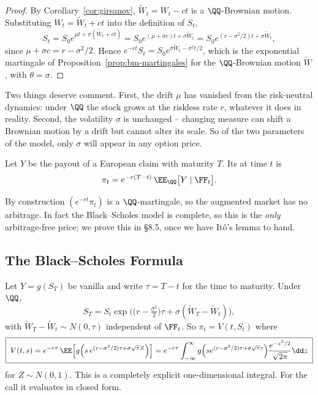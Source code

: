 \begin{proof}
	By Corollary~\ref{cor:girsanov}, $\tilde W_t = W_t - ct$ is a $\QQ$-Brownian motion. Substituting $W_t = \tilde W_t + ct$ into the definition of $S_t$,
	$$
	S_t = S_0 e^{\mu t + \sigma(\tilde W_t + ct)} = S_0 e^{(\mu + \sigma c)t + \sigma\tilde W_t} = S_0e^{(r-\sigma^2/2)t + \sigma\tilde W_t},
	$$
	since $\mu + \sigma c = r - \sigma^2/2$. Hence $e^{-rt}S_t = S_0e^{\sigma\tilde W_t - \sigma^2t/2}$, which is the exponential martingale of Proposition~\ref{prop:bm-martingales} for the $\QQ$-Brownian motion $\tilde W$, with $\theta = \sigma$.
\end{proof}

Two things deserve comment. First, the drift $\mu$ has vanished from the risk-neutral dynamics: under $\QQ$ the stock grows at the riskless rate $r$, whatever it does in reality. Second, the volatility $\sigma$ is unchanged -- changing measure can shift a Brownian motion by a drift but cannot alter its scale. So of the two parameters of the model, only $\sigma$ will appear in any option price.

\begin{definition}
	Let $Y$ be the payout of a European claim with maturity $T$. Its  at time $t$ is
	$$
	\pi_t = e^{-r(T-t)}\,\EE_\QQ\big[Y \mid \FF_t\big].
	$$
\end{definition}

By construction $(e^{-rt}\pi_t)$ is a $\QQ$-martingale, so the augmented market has no arbitrage. In fact the Black--Scholes model is complete, so this is the \emph{only} arbitrage-free price; we prove this in \S8.5, once we have It\^o's lemma to hand.

\subsection{The Black--Scholes Formula}

Let $Y = g(S_T)$ be vanilla and write $\tau = T-t$ for the time to maturity. Under $\QQ$,
$$
S_T = S_t\exp\Big(\big(r-\tfrac{\sigma^2}{2}\big)\tau + \sigma(\tilde W_T - \tilde W_t)\Big),
$$
with $\tilde W_T - \tilde W_t \sim N(0,\tau)$ independent of $\FF_t$. So $\pi_t = V(t,S_t)$ where
$$
\boxed{\;V(t,s) = e^{-r\tau}\,\EE\Big[g\Big(s\,e^{(r-\sigma^2/2)\tau + \sigma\sqrt\tau Z}\Big)\Big] = e^{-r\tau}\int_{-\infty}^\infty g\Big(se^{(r-\sigma^2/2)\tau+\sigma\sqrt\tau z}\Big)\frac{e^{-z^2/2}}{\sqrt{2\pi}}\dd z\;}
$$
for $Z \sim N(0,1)$. This is a completely explicit one-dimensional integral. For the call it evaluates in closed form.

